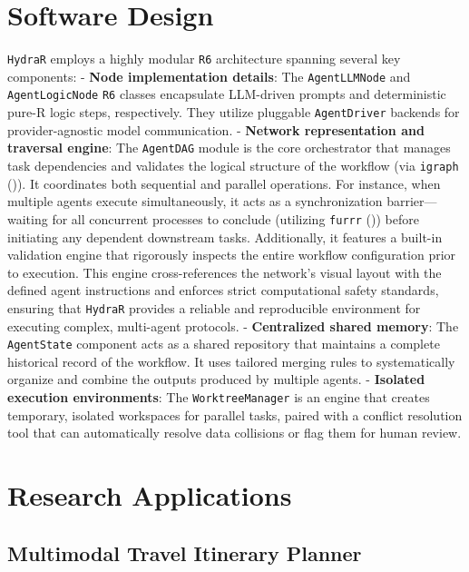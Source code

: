 \documentclass[10pt,a4paper,onecolumn]{article}
\begin{document}
\section{Software Design}\label{software-design}

\texttt{HydraR} employs a highly modular \texttt{R6} architecture
spanning several key components: - \textbf{Node implementation details}: The \texttt{AgentLLMNode} and \texttt{AgentLogicNode} \texttt{R6} classes encapsulate LLM-driven prompts and deterministic pure-R logic steps, respectively. They utilize pluggable \texttt{AgentDriver} backends for provider-agnostic model communication.
- \textbf{Network representation and traversal engine}: The \texttt{AgentDAG} module is the core orchestrator that manages task dependencies and validates the logical structure of the workflow (via \texttt{igraph} ()). It coordinates both sequential and parallel operations. For instance, when multiple agents execute simultaneously, it acts as a synchronization barrier---waiting for all concurrent processes to conclude (utilizing \texttt{furrr} ()) before initiating any dependent downstream tasks. Additionally, it features a built-in validation engine that rigorously inspects the entire workflow configuration prior to execution. This engine cross-references the network's visual layout with the defined agent instructions and enforces strict computational safety standards, ensuring that \texttt{HydraR} provides a reliable and reproducible environment for executing complex, multi-agent protocols.
- \textbf{Centralized shared memory}: The \texttt{AgentState} component acts as a shared repository that maintains a complete historical record of the workflow. It uses tailored merging rules to systematically organize and combine the outputs produced by multiple agents.
- \textbf{Isolated execution environments}: The \texttt{WorktreeManager} is an engine that creates temporary, isolated workspaces for parallel tasks, paired with a conflict resolution tool that can automatically resolve data collisions or flag them for human review.

\section{Research Applications}\label{research-applications}

\subsection{Multimodal Travel Itinerary
Planner}\label{multimodal-travel-itinerary-planner}
\end{document}
